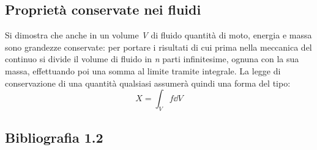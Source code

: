 \subsection{Proprietà conservate nei fluidi}
Si dimostra che anche in un volume \textit{V}  di fluido quantità di moto, energia e massa sono grandezze conservate: per portare i risultati di cui prima nella meccanica del continuo si divide il volume di fluido in \textit{n} parti infinitesime, ognuna con la sua massa, effettuando poi una somma al limite tramite integrale. La legge di conservazione di una quantità qualsiasi assumerà quindi una forma del tipo:
%
	\begin{equation*}
		X = \int_V f \dd{V}	
	\end{equation*}
%
\subsection*{Bibliografia 1.2}
\cite[Cap.\ 1.3]{PnueliGutfinger}
